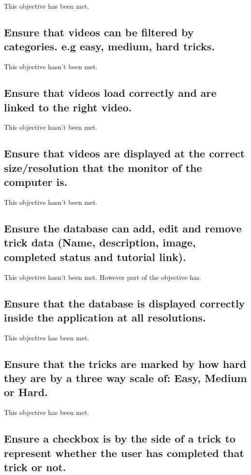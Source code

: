 This objective has been met.




\subsection {Ensure that videos can be filtered by categories. e.g easy, medium, hard tricks.}

This objective hasn't been met.




\subsection {Ensure that videos load correctly and are linked to the right video.}

This objective hasn't been met.




\subsection {Ensure that videos are displayed at the correct size/resolution that the monitor of the computer is.}

This objective hasn't been met.



\subsection {Ensure the database can add, edit and remove trick data (Name, description, image, completed status and tutorial link).}

This objective hasn't been met. However part of the objective has.

\subsection {Ensure that the database is displayed correctly inside the application at all resolutions.}

This objective has been met.

\subsection {Ensure that the tricks are marked by how hard they are by a three way scale of: Easy, Medium or Hard.}

This objective has been met.

\subsection {Ensure a checkbox is by the side of a trick to represent whether the user has completed that trick or not.}

